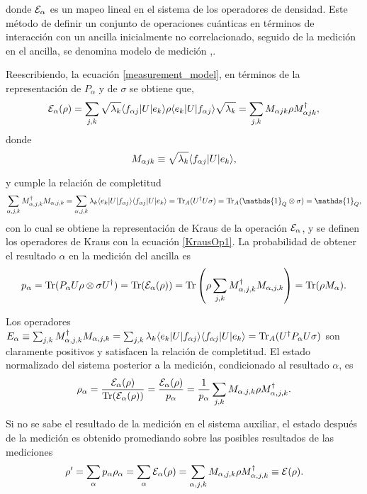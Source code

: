 donde $\mathcal{E}_\alpha$ es un mapeo lineal en el sistema de los operadores de densidad. Este método de definir un conjunto de operaciones cuánticas en términos de interacción con un ancilla inicialmente no correlacionado, seguido de la medición en el ancilla, se denomina modelo de medición {\cite{unm2014},\cite{nielsen_chuang_2010}}.

Reescribiendo, la ecuación {\ref{measurement_model}}, en términos de la representación de $P_\alpha$ y de $\sigma$ se obtiene que,
\begin{equation}
    \mathcal{E}_\alpha(\rho)=\sum_{j,k}\sqrt{\lambda_k}\langle f_{\alpha j}|U|e_k\rangle \rho \langle e_k|U|f_{\alpha j}\rangle \sqrt{\lambda_k}=\sum_{j,k}M_{\alpha j k}\rho M_ {\alpha j k}^\dagger,
\end{equation}
donde \begin{equation} \label{KrausOp1}
    M_{\alpha j k}\equiv \sqrt{\lambda_k}\langle f_{\alpha j}|U|e_k\rangle, 
\end{equation}

y cumple la relación de completitud \[\sum_{\alpha, j,k} M_{\alpha,j,k}^\dagger M_{\alpha,j,k}=\sum_{\alpha, j,k} \lambda_k \la e_k|U|f_{\alpha j}\ra \la f_{\alpha j}|U|e_k\ra= \tr_A(U^\dagger U \sigma)=\tr_A(\mathds{1}_Q\otimes\sigma)=\mathds{1}_Q,\] con lo cual se obtiene la representación de Kraus de la operación $\mathcal{E}_\alpha$, y se definen los operadores de Kraus con la ecuación {\ref{KrausOp1}}. La probabilidad de obtener el resultado $\alpha$ en la medición del ancilla es {\cite{unm2014}}
\begin{equation}
    p_\alpha={\rm Tr}(P_\alpha U\rho\otimes\sigma U^\dagger)={\rm Tr}(\mathcal{E}_\alpha(\rho))={\rm Tr}\left(\rho \sum _{j,k} M_{\alpha, j,k}^\dagger M_{\alpha,j,k}\right)={\rm Tr}(\rho M_\alpha).
\end{equation}


Los operadores $E_\alpha \equiv \sum _{j,k} M_{\alpha, j,k}^\dagger M_{\alpha,j,k}=\sum_{j,k} \lambda_k \langle e_k|U|f_{\alpha j}\rangle \langle f_{\alpha j}|U|e_k\rangle={\rm Tr}_A(U^\dagger P_\alpha U\sigma) $ son claramente positivos y satisfacen la relación de completitud. El estado normalizado del sistema posterior a la medición, condicionado al resultado $\alpha$, es {\cite{unm2014}}
\begin{equation}
    \rho_\alpha =\dfrac{\mathcal{E}_\alpha (\rho)}{{\rm Tr}(\mathcal{E}_\alpha(\rho))}=\dfrac{\mathcal{E}_\alpha(\rho)}{p_\alpha}=\dfrac{1}{p_\alpha}\sum_{j,k}M_{\alpha,j,k}\rho M_{\alpha,j,k}^\dagger.
\end{equation}

Si no se sabe el resultado de la medición en el sistema auxiliar, el estado después de la medición es obtenido promediando sobre las posibles resultados de las mediciones {\cite{unm2014}}
\begin{equation}
    \rho'=\sum_\alpha p_\alpha \rho_\alpha=\sum_\alpha \mathcal{E}_\alpha(\rho)=\sum_{\alpha,j,k} M_{\alpha,j,k}\rho M_{\alpha,j,k}^\dagger\equiv\mathcal{E}(\rho).
\end{equation}


